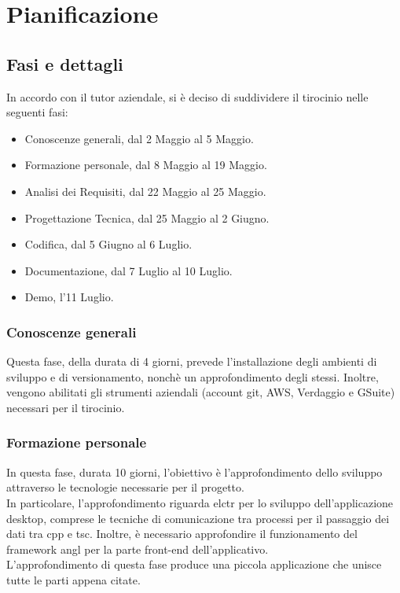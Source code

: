 \section{Pianificazione}

\subsection{Fasi e dettagli}

In accordo con il tutor aziendale, si è deciso di suddividere il tirocinio nelle seguenti fasi:
\begin{itemize}
    \item Conoscenze generali, dal 2 Maggio al 5 Maggio.
    \item Formazione personale, dal 8 Maggio al 19 Maggio.
    \item Analisi dei Requisiti, dal 22 Maggio al 25 Maggio.
    \item Progettazione Tecnica, dal 25 Maggio al 2 Giugno.
    \item Codifica, dal 5 Giugno al 6 Luglio.
    \item Documentazione, dal 7 Luglio al 10 Luglio.
    \item Demo, l'11 Luglio.
\end{itemize}

\subsubsection{Conoscenze generali}
Questa fase, della durata di 4 giorni, prevede l'installazione degli ambienti di sviluppo e di versionamento, nonchè un approfondimento degli stessi. Inoltre, vengono abilitati gli strumenti aziendali (account git, AWS, Verdaggio e GSuite) necessari per il tirocinio.
\subsubsection{Formazione personale}
In questa fase, durata 10 giorni, l'obiettivo è l'approfondimento dello sviluppo attraverso le tecnologie necessarie per il progetto.\\
In particolare, l'approfondimento riguarda \gls{elctr} per lo sviluppo dell'applicazione desktop, comprese le tecniche di comunicazione tra processi per il passaggio dei dati tra \gls{cpp} e \gls{tsc}. Inoltre, è necessario approfondire il funzionamento del framework \gls{angl} per la parte front-end dell'applicativo.\\
L'approfondimento di questa fase produce una piccola applicazione che unisce tutte le parti appena citate.
